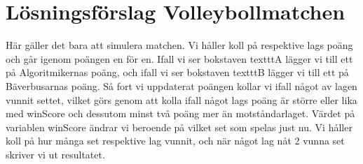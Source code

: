 \documentclass{article}
\begin{document}
\section*{Lösningsförslag Volleybollmatchen}

Här gäller det bara att simulera matchen. Vi håller koll på respektive lags poäng och går igenom poängen en för en. Ifall vi ser bokstaven texttt{A} lägger vi till ett på Algoritmikernas poäng, och ifall vi ser bokstaven texttt{B} lägger vi till ett på Bäverbusarnas poäng. Så fort vi uppdaterat poängen kollar vi ifall något av lagen vunnit settet, vilket görs genom att kolla ifall något lags poäng är större eller lika med winScore och dessutom minst två poäng mer än motståndarlaget. Värdet på variablen winScore ändrar vi beroende på vilket set som spelas just nu. Vi håller koll på hur många set respektive lag vunnit, och när något lag nåt 2 vunna set skriver vi ut resultatet. 


\end{document}
